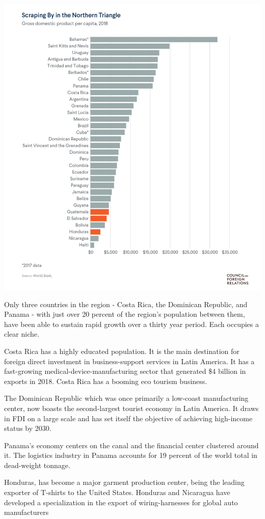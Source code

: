 \documentclass[
]{book}
\begin{document}
\includegraphics{fig/gdp_cap_central_america_caribbean.png}

Only three countries in the region - Costa Rica, the Dominican Republic, and Panama - with just over 20 percent of the region's population between them, have been able to sustain rapid growth over a thirty year period. Each occupies a clear niche.

Costa Rica has a highly educated population. It is the main destination for foreign direct investment in business-support services in Latin America. It has a fast-growing medical-device-manufacturing sector that generated \$4 billion in exports in 2018. Costa Rica has a booming eco tourism business.

The Dominican Republic which was once primarily a low-coast manufacturing center, now boasts the second-largest tourist economy in Latin America. It draws in FDI on a large scale and has set itself the objective of achieving high-income status by 2030.

Panama's economy centers on the canal and the financial center clustered around it. The logistics industry in Panama accounts for 19 percent of the world total in dead-weight tonnage.

Honduras, has become a major garment production center, being the leading exporter of T-shirts to the United States. Honduras and Nicaragua have developed a specialization in the export of wiring-harnesses for global auto manufacturers
\end{document}
